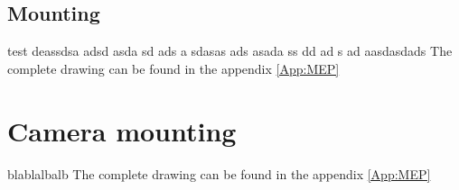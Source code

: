 \subsection{Mounting}
test deassdsa adsd asda sd ads a sdasas ads asada ss dd ad s ad aasdasdads 
\bigbreak
The complete drawing can be found in the appendix \ref{App:MEP}
\section{Camera mounting}\label{sec:Camera}
blablalbalb
\bigbreak
The complete drawing can be found in the appendix \ref{App:MEP}